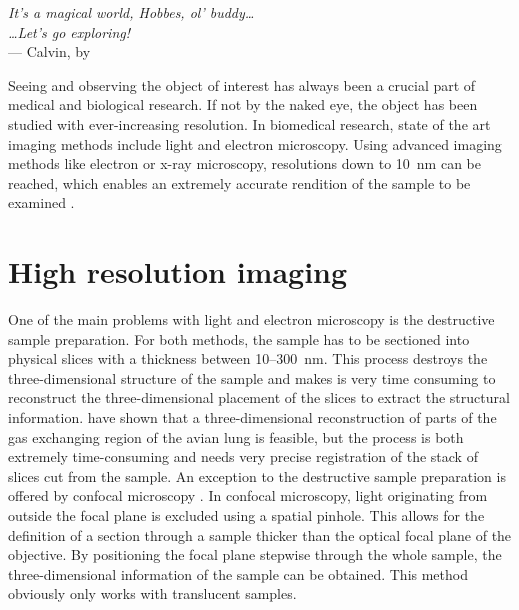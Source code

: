 \label{ch:Introduction}
\begin{flushright}{\slshape    
		It's a magical world, Hobbes, ol' buddy\ldots\\
		\ldots Let's go exploring!}\\ \medskip
		--- Calvin, by \citep{Watterson1996}
\end{flushright}
\vspace{52mm}

Seeing and observing the object of interest has always been a crucial part of medical and biological research. If not by the naked eye, the object has been studied with ever-increasing resolution. In biomedical research, state of the art imaging methods include light and electron microscopy. Using advanced imaging methods like electron or x-ray microscopy, resolutions down to \SI{10}{\nano\meter}  can be reached, which enables an extremely accurate rendition of the sample to be examined .

\section{High resolution imaging}
One of the main problems with light and electron microscopy is the destructive sample preparation. For both methods, the sample has to be sectioned into physical slices with a thickness between 10--\SI{300}{\nano\meter}. This process destroys the three-dimensional structure of the sample and makes is very time consuming to reconstruct the three-dimensional placement of the slices to extract the structural information. \citet{Woodward2005} have shown that a three-dimensional reconstruction of parts of the gas exchanging region of the avian lung is feasible, but the process is both extremely time-consuming and needs very precise registration of the stack of slices cut from the sample. An exception to the destructive sample preparation is offered by confocal microscopy \cite{Minsky1961}. In confocal microscopy, light originating from outside the focal plane is excluded using a spatial pinhole. This allows for the definition of a section through a sample thicker than the optical focal plane of the objective. By positioning the focal plane stepwise through the whole sample, the three-dimensional information of the sample can be obtained. This method obviously only works with translucent samples.

